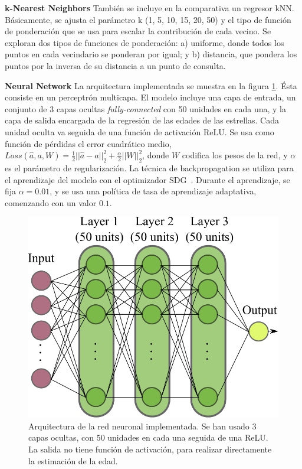 \vspace{0.5cm}

\textbf{k-Nearest Neighbors} {} También se incluye en la comparativa un regresor kNN. %
Básicamente, se ajusta el parámetro k (1, 5, 10, 15, 20, 50) y el tipo de función de ponderación que se usa para escalar la contribución de cada vecino. Se exploran dos tipos de funciones de ponderación: a) uniforme, donde todos los puntos en cada vecindario se ponderan por igual; y b) distancia, que pondera los puntos por la inversa de su distancia a un punto de consulta.

\vspace{0.5cm}

\textbf{Neural Network} {} La arquitectura implementada se muestra en la figura \ref{fig:neural_network}. Ésta consiste en un perceptrón multicapa. El modelo incluye una capa de entrada, un conjunto de 3 capas ocultas \emph{fully-connected} con 50 unidades en cada una, y la capa de salida encargada de la regresión de las edades de las estrellas. Cada unidad oculta va seguida de una función de activación ReLU. Se usa como función de pérdidas el error cuadrático medio, $Loss(\hat{a},a,W) = \frac{1}{2}||\hat{a} - a ||_2^2 + \frac{\alpha}{2} ||W||_2^2$, donde $W$ codifica los pesos de la red, y $\alpha$ es el parámetro de regularización. La técnica de backpropagation \cite{LeCun2012} se utiliza para el aprendizaje del modelo con el optimizador SDG~\cite{sgd}. Durante el aprendizaje, se fija $\alpha=0.01$, y se usa una política de tasa de aprendizaje adaptativa, comenzando con un valor $0.1$.

\vspace{0.5cm}

\begin{figure}[H]
\begin{center}
\includegraphics[width=0.6\linewidth]{Figuras/nnet.pdf}
\end{center}
\caption{Arquitectura de la red neuronal implementada. Se han usado 3 capas ocultas, con 50 unidades en cada una seguida de una ReLU. La salida no tiene función de activación, para realizar directamente la estimación de la edad.}
\label{fig:neural_network}
\end{figure}

